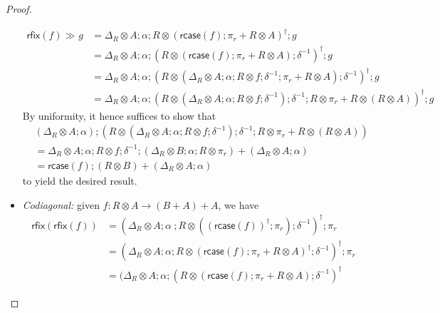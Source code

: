 \documentclass[acmsmall,screen,review]{acmart}
\newcommand{\ms}[1]{\ensuremath{\mathsf{#1}}}
\newcommand{\dmor}[1]{{\Delta}_{#1}}
\newcommand{\rcase}[1]{\ms{rcase}(#1)}
\newcommand{\rfix}[1]{\ms{rfix}(#1)}
\newcommand{\rseq}[3]{#2 \gg_{#1} #3}
\begin{document}
\begin{proof}
\begin{itemize}
    \begin{equation}
      \begin{aligned}
        \rseq{}{\rfix{f}}{g} 
        & = \dmor{R} \otimes A ; \alpha ; R \otimes (\rcase{f} ; \pi_r + R \otimes A)^\dagger ; g \\
        & = \dmor{R} \otimes A ; \alpha 
          ; (R \otimes (\rcase{f} ; \pi_r + R \otimes A) ; \delta^{-1})^\dagger ; g \\
        & = \dmor{R} \otimes A ; \alpha 
          ; (R \otimes 
            (\dmor{R} \otimes A ; \alpha ; R \otimes f ; \delta^{-1} ; \pi_r + R \otimes A) 
            ; \delta^{-1})^\dagger ; g \\
        & = \dmor{R} \otimes A ; \alpha 
          ; (R \otimes 
            (\dmor{R} \otimes A ; \alpha ; R \otimes f ; \delta^{-1}) 
            ; \delta^{-1} ; R \otimes \pi_r + R \otimes (R \otimes A))^\dagger ; g
      \end{aligned}
    \end{equation}
    By uniformity, it hence suffices to show that
    \begin{equation}
      \begin{aligned}
        & (\dmor{R} \otimes A ; \alpha)
          ; (R \otimes 
          (\dmor{R} \otimes A ; \alpha ; R \otimes f ; \delta^{-1}) 
          ; \delta^{-1} ; R \otimes \pi_r + R \otimes (R \otimes A)) \\
        & = \dmor{R} \otimes A ; \alpha ; R \otimes f ; \delta^{-1}
          ; (\dmor{R} \otimes B ; \alpha ; R \otimes \pi_r)
          + (\dmor{R} \otimes A ; \alpha) \\
        & = \rcase{f} ; (R \otimes B) + (\dmor{R} \otimes A ; \alpha)
      \end{aligned}
    \end{equation}
    to yield the desired result.
    \item \emph{Codiagonal:} given $f : R \otimes A \to (B + A) + A$, we have
    \begin{equation}
      \begin{aligned}
        \rfix{\rfix{f}} 
        & = (\dmor{R} \otimes A ; \alpha \
            ; R \otimes ((\rcase{f})^\dagger ; \pi_r) ; \delta^{-1})^\dagger 
          ; \pi_r \\
        & = (\dmor{R} \otimes A ; \alpha 
            ; R \otimes (\rcase{f} ; \pi_r + R \otimes A)^\dagger
            ; \delta^{-1})^\dagger 
          ; \pi_r \\
        & = (\dmor{R} \otimes A ; \alpha 
            ; (R \otimes (\rcase{f} ; \pi_r + R \otimes A) ; \delta^{-1})^\dagger

\end{aligned}
\end{equation}
\end{itemize}
\end{proof}
\end{document}
